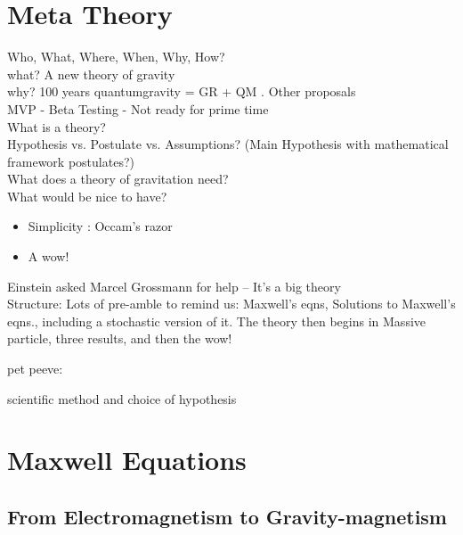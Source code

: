 \documentclass {article}
\begin{document}
\section{Meta Theory}

Who, What, Where, When, Why, How?
\\[0.15in]
what?    A new theory of  gravity
\\
why?   100 years quantumgravity = GR + QM . Other proposals
\\[1in]


MVP - Beta Testing - Not ready for prime time
\\

What is a theory?
\\[1in]

Hypothesis vs. Postulate vs. Assumptions? (Main Hypothesis with mathematical framework postulates?)
\\[1in]



What does a theory of gravitation need?
\\[2in]

What would be nice to have? 
\begin{itemize}
	\item Simplicity : Occam's razor
	\item A wow!
\end{itemize}

\vspace{10pt}

Einstein asked Marcel Grossmann for help -- It's a big theory
\\[2in]

Structure: Lots of pre-amble to remind us: Maxwell's eqns, Solutions to Maxwell's eqns., including a stochastic version of it. The theory then begins in Massive particle, three results, and then the wow!

pet peeve:

scientific method and choice of hypothesis


\newpage


\section{Maxwell Equations}
\subsection{From Electromagnetism to Gravity-magnetism}
\end{document}
